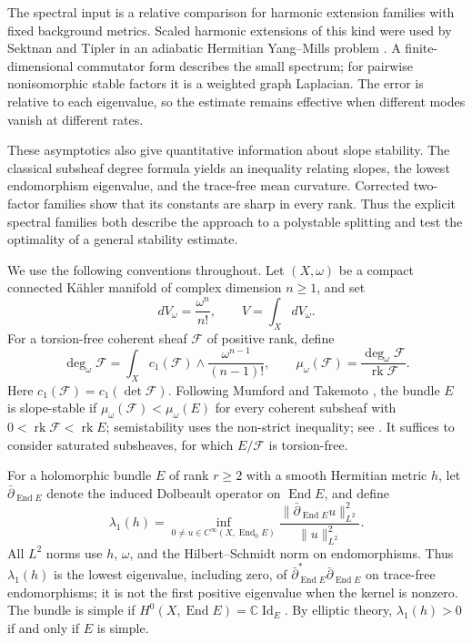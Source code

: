 \documentclass[11pt]{amsart}
\theoremstyle{definition}
\theoremstyle{remark}
\newcommand{\CC}{\mathbb C}
\newcommand{\End}{\operatorname{End}}
\newcommand{\rk}{\operatorname{rk}}
\newcommand{\id}{\operatorname{Id}}
\newcommand{\db}{\bar\partial}
\begin{document}
The spectral input is a relative comparison for harmonic extension
families with fixed background metrics. Scaled harmonic extensions of
this kind were used by Sektnan and Tipler in an adiabatic Hermitian
Yang--Mills problem \cite[Section~5]{SektnanTipler2024}. A finite-dimensional commutator
form describes the small spectrum; for pairwise nonisomorphic stable
factors it is a weighted graph Laplacian. The error is relative to each
eigenvalue, so the estimate remains effective when different modes
vanish at different rates.

These asymptotics also give quantitative information about slope
stability. The classical subsheaf degree formula
\cite{Kobayashi1987,Lubke1983} yields an inequality
relating slopes, the lowest endomorphism eigenvalue, and the trace-free
mean curvature. Corrected two-factor families show that its constants are
sharp in every rank. Thus the explicit spectral families
both describe the approach to a polystable splitting and test the
optimality of a general stability estimate.

We use the following conventions throughout. Let $(X,\omega)$ be a
compact connected K\"ahler manifold of complex dimension $n\ge1$, and set
\[
 dV_\omega=\frac{\omega^n}{n!},\qquad V=\int_X dV_\omega.
\]
For a torsion-free coherent sheaf $\mathcal F$ of positive rank, define
\[
 \deg_\omega\mathcal F
 =\int_X c_1(\mathcal F)\wedge\frac{\omega^{n-1}}{(n-1)!},
 \qquad
 \mu_\omega(\mathcal F)=\frac{\deg_\omega\mathcal F}{\rk\mathcal F}.
\]
Here $c_1(\mathcal F)=c_1(\det\mathcal F)$. Following Mumford and
Takemoto \cite{Mumford1963,Takemoto1972}, the bundle $E$ is
slope-stable if $\mu_\omega(\mathcal F)<\mu_\omega(E)$ for every
coherent subsheaf with $0<\rk\mathcal F<\rk E$; semistability uses
the non-strict inequality; see \cite[Chapter~V]{Kobayashi1987}. It suffices to consider saturated subsheaves,
for which $E/\mathcal F$ is torsion-free.

For a holomorphic bundle $E$ of rank $r\ge2$ with a smooth Hermitian
metric $h$, let $\db_{\End E}$ denote the induced Dolbeault operator on
$\End E$, and define
\begin{equation}\label{eq:lambda}
 \lambda_1(h)=
 \inf_{0\ne u\in C^\infty(X,\End_0 E)}
 \frac{\lVert\db_{\End E}u\rVert_{L^2}^2}{\lVert u\rVert_{L^2}^2}.
\end{equation}
All $L^2$ norms use $h$, $\omega$, and the Hilbert--Schmidt norm on
endomorphisms. Thus $\lambda_1(h)$ is the lowest eigenvalue, including
zero, of $\db_{\End E}^{*}\db_{\End E}$ on trace-free endomorphisms;
it is not the first positive eigenvalue when the kernel is nonzero.
The bundle is simple if $H^0(X,\End E)=\CC\id_E$. By elliptic theory,
$\lambda_1(h)>0$ if and only if $E$ is simple.
\end{document}

